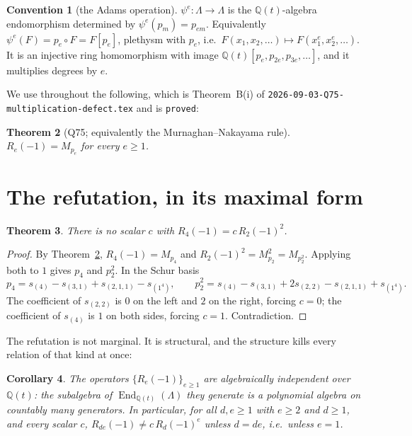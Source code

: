 \documentclass[11pt]{article}
\newtheorem{theorem}{Theorem}
\newtheorem{corollary}[theorem]{Corollary}
\theoremstyle{definition}
\newtheorem{convention}[theorem]{Convention}
\newcommand{\Q}{\mathbb{Q}}
\newcommand{\Lam}{\Lambda}
\newcommand{\Mult}[1]{M_{#1}}
\begin{document}
\begin{convention}[the Adams operation]\label{conv:adams}
$\psi^{e}:\Lam\to\Lam$ is the $\Q(t)$-algebra endomorphism determined by
$\psi^{e}(p_m)=p_{em}$.  Equivalently $\psi^{e}(F)=p_e\circ F=F[p_e]$, plethysm with $p_e$,
i.e.\ $F(x_1,x_2,\dots)\mapsto F(x_1^{e},x_2^{e},\dots)$.  It is an injective ring
homomorphism with image $\Q(t)[p_e,p_{2e},p_{3e},\dots]$, and it multiplies degrees by $e$.
\end{convention}

We use throughout the following, which is Theorem~B(i) of
\texttt{2026-09-03-Q75-multiplication-defect.tex} and is \texttt{proved}:

\begin{theorem}[Q75; equivalently the Murnaghan--Nakayama rule]\label{thm:q75}
$R_e(-1)=\Mult{p_e}$ for every $e\ge1$.
\end{theorem}

\section{The refutation, in its maximal form}\label{sec:refute}

\begin{theorem}\label{thm:refute}
There is no scalar $c$ with $R_4(-1)=c\,R_2(-1)^{2}$.
\end{theorem}

\begin{proof}
By Theorem~\ref{thm:q75}, $R_4(-1)=\Mult{p_4}$ and $R_2(-1)^2=\Mult{p_2}^2=\Mult{p_2^2}$.
Applying both to $1$ gives $p_4$ and $p_2^2$.  In the Schur basis
\[
  p_4=s_{(4)}-s_{(3,1)}+s_{(2,1,1)}-s_{(1^4)},\qquad
  p_2^{2}=s_{(4)}-s_{(3,1)}+2s_{(2,2)}-s_{(2,1,1)}+s_{(1^4)} .
\]
The coefficient of $s_{(2,2)}$ is $0$ on the left and $2$ on the right, forcing $c=0$; the
coefficient of $s_{(4)}$ is $1$ on both sides, forcing $c=1$.  Contradiction.
\end{proof}

The refutation is not marginal.  It is structural, and the structure kills every relation of
that kind at once:

\begin{corollary}\label{cor:free}
The operators $\{R_e(-1)\}_{e\ge1}$ are algebraically independent over $\Q(t)$: the
subalgebra of $\operatorname{End}_{\Q(t)}(\Lam)$ they generate is a polynomial algebra on
countably many generators.  In particular, for all $d,e\ge1$ with $e\ge2$ and $d\ge1$, and
every scalar $c$, $R_{de}(-1)\neq c\,R_{d}(-1)^{e}$ unless $d=de$, i.e.\ unless $e=1$.
\end{corollary}
\end{document}
